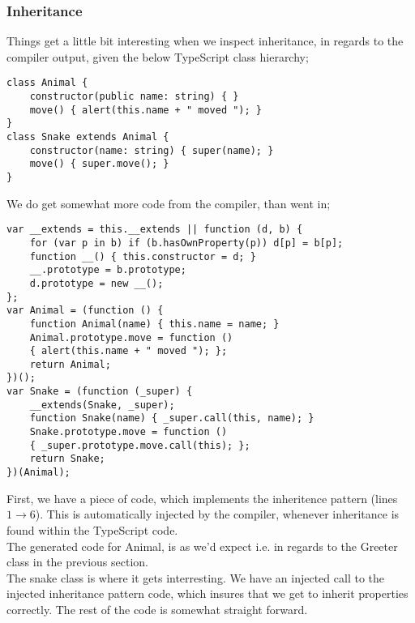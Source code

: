 \subsubsection*{Inheritance}
Things get a little bit interesting when we inspect inheritance, in regards to the compiler output, given the below TypeScript class hierarchy;
\begin{verbatim}
class Animal {
    constructor(public name: string) { }
    move() { alert(this.name + " moved "); }
}
class Snake extends Animal {
    constructor(name: string) { super(name); }
    move() { super.move(); }
}
\end{verbatim}
We do get somewhat more code from the compiler, than went in;
\begin{verbatim}
var __extends = this.__extends || function (d, b) {
    for (var p in b) if (b.hasOwnProperty(p)) d[p] = b[p];
    function __() { this.constructor = d; }
    __.prototype = b.prototype;
    d.prototype = new __();
};
var Animal = (function () {
    function Animal(name) { this.name = name; }
    Animal.prototype.move = function ()
    { alert(this.name + " moved "); };
    return Animal;
})();
var Snake = (function (_super) {
    __extends(Snake, _super);
    function Snake(name) { _super.call(this, name); }
    Snake.prototype.move = function ()
    { _super.prototype.move.call(this); };
    return Snake;
})(Animal);
\end{verbatim}
First, we have a piece of code, which implements the inheritence pattern (lines $1\rightarrow6$).
This is automatically injected by the compiler, whenever inheritance is found within the TypeScript code.
\\
The generated code for Animal, is as we'd expect i.e. in regards to the Greeter class in the previous section.
\\
The snake class is where it gets interresting. We have an injected call to the injected inheritance pattern code, which insures that we get to inherit properties correctly.
The rest of the code is somewhat straight forward.

